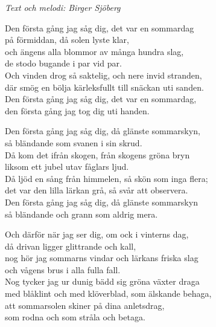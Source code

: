 {\footnotesize\textit{Text och melodi: Birger Sjöberg}}\par
\vspace{10pt}
Den första gång jag såg dig, det var en sommardag\\
på förmiddan, då solen lyste klar,\\
och ängens alla blommor av många hundra slag,\\
de stodo bugande i par vid par.\\
Och vinden drog så saktelig, och nere invid stranden,\\
där smög en bölja kärleksfullt till snäckan uti sanden.\\
Den första gång jag såg dig, det var en sommardag,\\
den första gång jag tog dig uti handen.\par
\vspace{10pt}
Den första gång jag såg dig, då glänste sommarskyn,\\
så bländande som svanen i sin skrud.\\
Då kom det ifrån skogen, från skogens gröna bryn\\
liksom ett jubel utav fåglars ljud.\\
Då ljöd en sång från himmelen, så skön som inga flera;\\
det var den lilla lärkan grå, så svår att observera.\\
Den första gång jag såg dig, då glänste sommarskyn\\
så bländande och grann som aldrig mera.\par
\vspace{10pt}
Och därför när jag ser dig, om ock i vinterns dag,\\
då drivan ligger glittrande och kall,\\
nog hör jag sommarns vindar och lärkans friska slag\\
och vågens brus i alla fulla fall.\\
Nog tycker jag ur dunig bädd sig gröna växter draga\\
med blåklint och med klöverblad, som älskande behaga,\\
att sommarsolen skiner på dina anletsdrag,\\
som rodna och som stråla och betaga.
